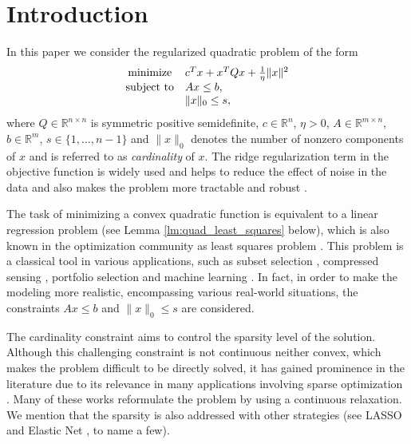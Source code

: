 \documentclass[smallextended,referee,envcountsect]{svjour3}
\newcommand{\R}{\mathbb{R}}
\begin{document}
\section{Introduction}
\label{sec:intro}
In this paper we consider the regularized quadratic problem of the form 
\begin{equation}
\label{problem_x}
\begin{array}{cl}
\mathop{\rm minimize } & c^Tx+x^TQx+\frac{1}{\eta}\|x\|^2 \\ 
{\rm subject\ to } & Ax\leq b, \\ 
& \|x\|_0\leq s,
\end{array}
\end{equation}
where $Q\in\R^{n\times n}$ is symmetric positive semidefinite, $c\in\R^n$, $\eta>0$, 
$A\in\R^{m\times n}$, $b\in\R^m$, $s\in\{1,\ldots,n-1\}$ and $\|x\|_0$ denotes the 
number of nonzero components of $x$ and is referred to as {\em cardinality} of $x$. 
The ridge regularization term in the objective function is widely used and 
helps to reduce the effect of noise in the data and also makes the problem more 
tractable and robust \cite{BertsimasCory-Wright22,BertsimasParys20,HoerlKennard70,Tikhonov43}.

The task of minimizing a convex quadratic function is equivalent to a linear regression 
problem (see Lemma \ref{lm:quad_least_squares} below), 
which is also known in the optimization community as least squares 
problem \cite{HastieTibshiraniFriedman08,MontgomeryPeckVining21}. 
This problem is a classical tool in various applications, such as 
subset selection \cite{Miller02,Tibshirani}, 
compressed sensing \cite{Donoho06,EldarKutyniok12}, 
portfolio selection \cite{BertsimasCory-Wright22,Markowitz52} 
and machine learning \cite{BennettMangasarian92,CristianiniShaweTaylor00,Mangasarian}.
In fact, in order to make the modeling more realistic, encompassing various real-world 
situations, the constraints $Ax\leq b$ and $\|x\|_0\leq s$ are considered.

The cardinality constraint aims to control the sparsity level of the solution. 
Although this challenging constraint is not continuous neither convex, which makes the 
problem difficult to be directly solved, it has gained prominence in the literature due 
to its relevance in many applications involving sparse optimization 
\cite{BeckEldar,BeckHallak16,BurdakovKanzowSchwartz16,KanzowRaharjaSchwartz21a,KrejicKrulikovskiRaydan23,KrulikovskiRibeiroSachine21,MedeirosRibeiroSachineSecchin24,RaydanKrejicKrulikovski23,RibeiroSachineKrulikovski22}. 
Many of these works reformulate the problem by using a continuous relaxation. 
We mention that the sparsity is also addressed with other strategies 
(see LASSO \cite{Tibshirani} and Elastic Net \cite{ZouHastie05}, to name a few).
\end{document}
